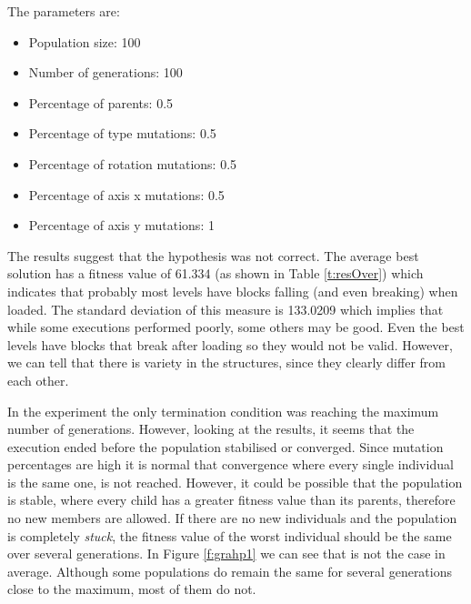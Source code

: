The parameters are:
\begin{itemize}
	\item Population size: 100
	\item Number of generations: 100
	\item Percentage of parents: 0.5
	\item Percentage of type mutations: 0.5
	\item Percentage of rotation mutations: 0.5
	\item Percentage of axis x mutations: 0.5
	\item Percentage of axis y mutations: 1
\end{itemize}

The results suggest that the hypothesis was not correct. The average best solution has a fitness value of 61.334 (as shown in Table \ref{t:resOver}) which indicates that probably most levels have blocks falling (and even breaking) when loaded. The standard deviation of this measure is 133.0209 which implies that while some executions performed poorly, some others may be good. Even the best levels have blocks that break after loading so they would not be valid. However, we can tell that there is variety in the structures, since they clearly differ from each other. 

In the experiment the only termination condition was reaching the maximum number of generations. However, looking at the results, it seems that the execution ended before the population stabilised or converged. Since mutation percentages are high it is normal that convergence where every single individual is the same one, is not reached. However, it could be possible that the population is stable, where every child has a greater fitness value than its parents, therefore no new members are allowed. If there are no new individuals and the population is completely \textit{stuck}, the fitness value of the worst individual should be the same over several generations. In Figure \ref{f:grahp1} we can see that is not the case in average. Although some populations do remain the same for several generations close to the maximum, most of them do not.

